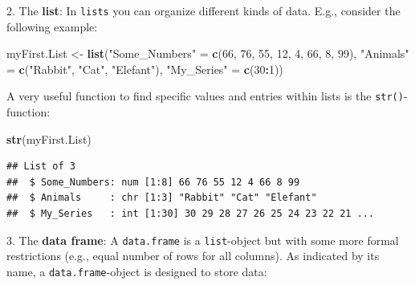 \documentclass[]{book}
\newenvironment{Shaded}{\begin{snugshade}}{\end{snugshade}}
\newcommand{\DecValTok}[1]{\textcolor[rgb]{0.00,0.00,0.81}{#1}}
\newcommand{\KeywordTok}[1]{\textcolor[rgb]{0.13,0.29,0.53}{\textbf{#1}}}
\newcommand{\NormalTok}[1]{#1}
\newcommand{\OperatorTok}[1]{\textcolor[rgb]{0.81,0.36,0.00}{\textbf{#1}}}
\newcommand{\StringTok}[1]{\textcolor[rgb]{0.31,0.60,0.02}{#1}}
\theoremstyle{definition}
\theoremstyle{definition}
\theoremstyle{definition}
\theoremstyle{remark}
\begin{document}
2. The \textbf{list}: In \texttt{lists} you can organize different kinds of data. E.g., consider the following example:

\begin{Shaded}
\begin{Highlighting}[]
\NormalTok{myFirst.List <-}\StringTok{ }\KeywordTok{list}\NormalTok{(}\StringTok{"Some_Numbers"}\NormalTok{ =}\StringTok{ }\KeywordTok{c}\NormalTok{(}\DecValTok{66}\NormalTok{, }\DecValTok{76}\NormalTok{, }\DecValTok{55}\NormalTok{, }\DecValTok{12}\NormalTok{, }\DecValTok{4}\NormalTok{, }\DecValTok{66}\NormalTok{, }\DecValTok{8}\NormalTok{, }\DecValTok{99}\NormalTok{), }
                     \StringTok{"Animals"}\NormalTok{      =}\StringTok{ }\KeywordTok{c}\NormalTok{(}\StringTok{"Rabbit"}\NormalTok{, }\StringTok{"Cat"}\NormalTok{, }\StringTok{"Elefant"}\NormalTok{),}
                     \StringTok{"My_Series"}\NormalTok{    =}\StringTok{ }\KeywordTok{c}\NormalTok{(}\DecValTok{30}\OperatorTok{:}\DecValTok{1}\NormalTok{)) }
\end{Highlighting}
\end{Shaded}

A very useful function to find specific values and entries within lists is the \texttt{str()}-function:

\begin{Shaded}
\begin{Highlighting}[]
\KeywordTok{str}\NormalTok{(myFirst.List)}
\end{Highlighting}
\end{Shaded}

\begin{verbatim}
## List of 3
##  $ Some_Numbers: num [1:8] 66 76 55 12 4 66 8 99
##  $ Animals     : chr [1:3] "Rabbit" "Cat" "Elefant"
##  $ My_Series   : int [1:30] 30 29 28 27 26 25 24 23 22 21 ...
\end{verbatim}

3. The \textbf{data frame}: A \texttt{data.frame} is a \texttt{list}-object but with some more formal restrictions (e.g., equal number of rows for all columns). As indicated by its name, a \texttt{data.frame}-object is designed to store data:
\end{document}
